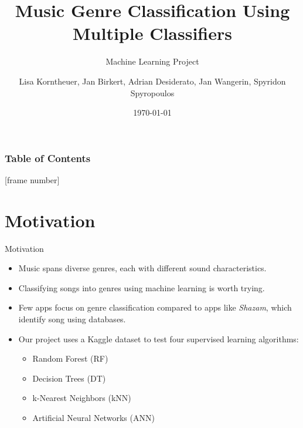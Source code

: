 \documentclass[10pt, aspectratio=169]{beamer}
\title{Music Genre Classification Using Multiple Classifiers}
\subtitle{Machine Learning Project}
\author{Lisa Korntheuer, Jan Birkert, Adrian Desiderato, Jan Wangerin, Spyridon Spyropoulos}
\institute{Technische Hochschule Ulm}
\date{\today}
\begin{document}
\newcommand{\subtext}[1]{$_{\text{#1}}$}

\begin{frame}
    \maketitle
\end{frame}
\begin{frame}[noframenumbering]
    \frametitle{Table of Contents}
    \tableofcontents
\end{frame}
\AtBeginSection[]{
        }
        [frame number]
\section{Motivation}
\begin{frame}{Motivation}
    \begin{itemize}
        \item Music spans diverse genres, each with different sound characteristics.
        \item Classifying songs into genres using machine learning is worth trying.
        \item Few apps focus on genre classification compared to apps like \textit{Shazam}, which identify song using databases.
        \item Our project uses a Kaggle dataset to test four supervised learning algorithms:
        \begin{itemize}
            \item Random Forest (RF)
            \item Decision Trees (DT)
            \item k-Nearest Neighbors (kNN)
            \item Artificial Neural Networks (ANN)
        \end{itemize}
    \end{itemize}
\end{frame}
\end{document}
